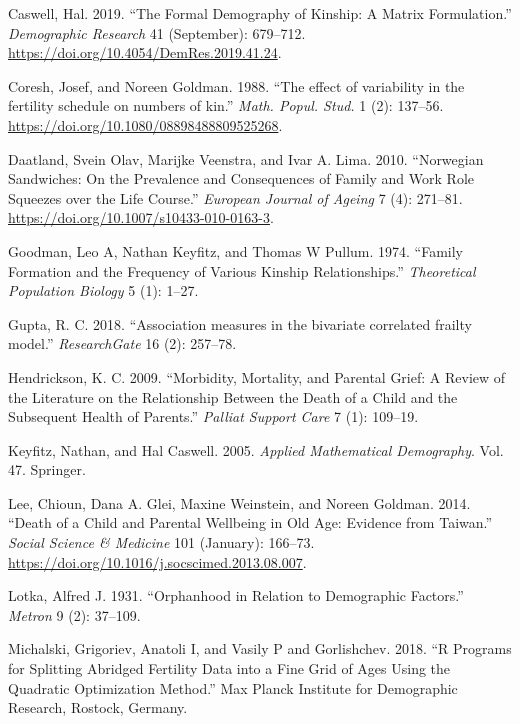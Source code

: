 \documentclass[
]{article}
\begin{document}
\leavevmode\hypertarget{ref-caswell_formal_2019}{}%
Caswell, Hal. 2019. ``The Formal Demography of Kinship: A Matrix
Formulation.'' \emph{Demographic Research} 41 (September): 679--712.
\url{https://doi.org/10.4054/DemRes.2019.41.24}.

\leavevmode\hypertarget{ref-Coresh1988}{}%
Coresh, Josef, and Noreen Goldman. 1988. ``The effect of variability in
the fertility schedule on numbers of kin.'' \emph{Math. Popul. Stud.} 1
(2): 137--56. \url{https://doi.org/10.1080/08898488809525268}.

\leavevmode\hypertarget{ref-daatland_norwegian_2010}{}%
Daatland, Svein Olav, Marijke Veenstra, and Ivar A. Lima. 2010.
``Norwegian Sandwiches: On the Prevalence and Consequences of Family and
Work Role Squeezes over the Life Course.'' \emph{European Journal of
Ageing} 7 (4): 271--81. \url{https://doi.org/10.1007/s10433-010-0163-3}.

\leavevmode\hypertarget{ref-goodman1974}{}%
Goodman, Leo A, Nathan Keyfitz, and Thomas W Pullum. 1974. ``Family
Formation and the Frequency of Various Kinship Relationships.''
\emph{Theoretical Population Biology} 5 (1): 1--27.

\leavevmode\hypertarget{ref-Gupta2018}{}%
Gupta, R. C. 2018. ``Association measures in the bivariate correlated
frailty model.'' \emph{ResearchGate} 16 (2): 257--78.

\leavevmode\hypertarget{ref-Hendrickson2009}{}%
Hendrickson, K. C. 2009. ``Morbidity, Mortality, and Parental Grief: A
Review of the Literature on the Relationship Between the Death of a
Child and the Subsequent Health of Parents.'' \emph{Palliat Support
Care} 7 (1): 109--19.

\leavevmode\hypertarget{ref-KeyfitzMath}{}%
Keyfitz, Nathan, and Hal Caswell. 2005. \emph{Applied Mathematical
Demography}. Vol. 47. Springer.

\leavevmode\hypertarget{ref-lee_death_2014}{}%
Lee, Chioun, Dana A. Glei, Maxine Weinstein, and Noreen Goldman. 2014.
``Death of a Child and Parental Wellbeing in Old Age: Evidence from
Taiwan.'' \emph{Social Science \& Medicine} 101 (January): 166--73.
\url{https://doi.org/10.1016/j.socscimed.2013.08.007}.

\leavevmode\hypertarget{ref-lotka1931orphanhood}{}%
Lotka, Alfred J. 1931. ``Orphanhood in Relation to Demographic
Factors.'' \emph{Metron} 9 (2): 37--109.

\leavevmode\hypertarget{ref-Michalski2018}{}%
Michalski, Grigoriev, Anatoli I, and Vasily P and Gorlishchev. 2018. ``R
Programs for Splitting Abridged Fertility Data into a Fine Grid of Ages
Using the Quadratic Optimization Method.'' Max Planck Institute for
Demographic Research, Rostock, Germany.
\end{document}
